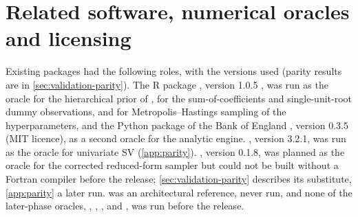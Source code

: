\section{Related software, numerical oracles and licensing}\label{sec:related}

Existing packages had the following roles, with the versions used (parity results are in \cref{sec:validation-parity}).
The R package  \citep{kuschnig2021bvar}, version 1.0.5 \citep{kuschnig2024bvar}, was run as the oracle for the hierarchical prior of \citet{giannone2015prior}, for the sum-of-coefficients and single-unit-root dummy observations, and for Metropolis--Hastings sampling of the hyperparameters, %
and the Python package  of the Bank of England \citep{labonne2026bvar}, version 0.3.5 (MIT licence), as a second oracle for the analytic engine. %
 \citep{kastner2016dealing,hosszejni2021modeling}, version 3.2.1, was run as the oracle for univariate SV (\cref{app:parity}). %
 \citep{gruber2026bayesianvars}, version 0.1.8, was planned as the oracle for the corrected reduced-form sampler but could not be built without a Fortran compiler before the release; \cref{sec:validation-parity} describes its substitute, \cref{app:parity} a later run. %
 \citep{mohr2026bvartools} was an architectural reference, never run, %
and none of the later-phase oracles,  \citep{kastner2026factorstochvol},  \citep{liu2026bvars},  \citep{wozniak2026bsvars},  \citep{wang2026bsvarsigns} and  \citep{krueger2015bvarsv}, was run before the release. %

